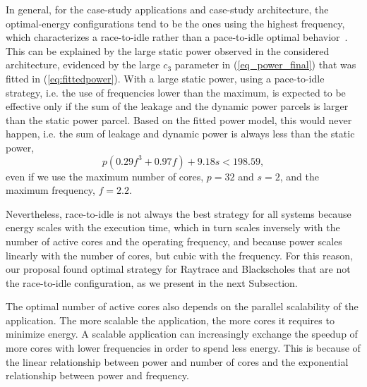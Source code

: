In general, for the case-study applications and case-study architecture, the optimal-energy configurations tend to be the ones using the highest frequency, which characterizes a race-to-idle rather than a pace-to-idle optimal behavior~\cite{kim2015racing}. This can be explained by the large static power observed in the considered architecture, evidenced by the large $c_3$ parameter in (\ref{eq_power_final}) that was fitted in (\ref{eq:fittedpower}). With a large static power, using a pace-to-idle strategy, i.e. the use of frequencies lower than the maximum, is expected to be effective only if the sum of the leakage and the dynamic power parcels is larger than the static power parcel. 
Based on the fitted power model, this would never happen, i.e. the sum of leakage and dynamic power is always less than the static power,
\begin{equation*}
p(0.29f^3+0.97f)+9.18s < 198.59,
\label{ineq:race_to_idle}
\end{equation*}
even if we use the maximum number of cores, $p=32$ and $s=2$, and the maximum frequency, $f=2.2$.

Nevertheless, race-to-idle is not always the best strategy for all systems because energy scales with the execution time, which in turn scales inversely with the number of active cores and the operating frequency, and because power scales linearly with the number of cores, but cubic with the frequency. For this reason, our proposal found optimal strategy for Raytrace and Blackscholes that are not the race-to-idle configuration, as we present in the next Subsection. 

The optimal number of active cores also depends on the parallel scalability of the application. The more scalable the application, the more cores it requires to minimize energy. A scalable application can increasingly exchange the speedup of more cores with lower frequencies in order to spend less energy. This is because of the linear relationship between power and number of cores and the exponential relationship between power and frequency.  

